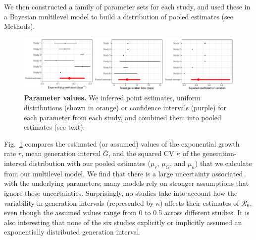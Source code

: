 \documentclass[12pt]{article}
\newcommand{\fref}[1]{Fig.~\ref{fig:#1}}
\begin{document}
We then constructed a family of parameter sets for each study, and used these in a Bayesian multilevel model to build a distribution of pooled estimates (see Methods).

\begin{figure}[!ht]
\includegraphics[width=\textwidth]{compare_assumption.pdf}
\caption{
\textbf{Parameter values.}
We inferred point estimates, uniform distributions (shown in orange) or confidence intervals (purple) for each parameter from each study, and combined them into pooled estimates (see text).
}
\label{fig:assumption}
\end{figure}

\fref{assumption} compares the estimated (or assumed) values of the exponential growth rate $r$, mean generation interval $\bar G$, and the squared CV $\kappa$ of the generation-interval distribution with our pooled estimates ($\mu_r$, $\mu_G$, and $\mu_\kappa$) that we calculate from our multilevel model.
We find that there is a large uncertainty associated with the underlying parameters;
many models rely on stronger assumptions that ignore these uncertainties.
Surprisingly, no studies take into account how the variability in generation intervals (represented by $\kappa$) affects their estimates of $\mathcal R_0$, even though the assumed values range from 0 to 0.5 across different studies.
It is also interesting that none of the six studies explicitly or implicitly assumed an exponentially distributed generation interval.
\end{document}

